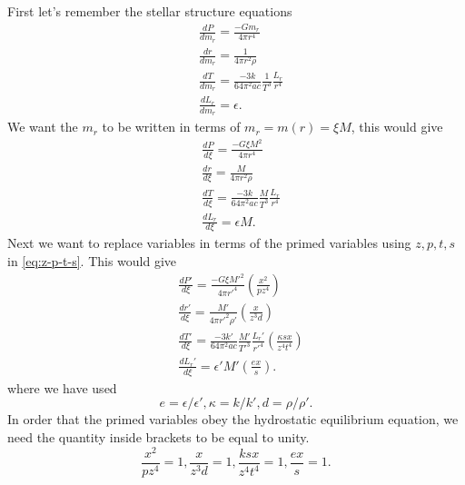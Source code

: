 \documentclass{revtex4-2}
\begin{document}
First let's remember the stellar structure equations
\begin{equation}
  \label{eq:hydrostatic}
  \begin{aligned}
    & \frac{dP}{dm_r} = \frac{-G m_r}{4\pi r^4} \\
    & \frac{dr}{dm_r} = \frac{1}{4\pi r^2 \rho}\\
    & \frac{dT}{dm_r} = \frac{-3k}{64\pi^2 ac} \frac{1}{T^3}\frac{L_r}{r^4}\\
    & \frac{dL_r}{dm_r} = \epsilon.
  \end{aligned}
\end{equation}
We want the $m_r$ to be written in terms of $m_r = m(r) = \xi M$, this would give
\begin{equation}
  \label{eq:hydrostatic-in-xi}
  \begin{aligned}
    & \frac{dP}{d\xi} = \frac{-G \xi M^2}{4\pi r^4} \\
    & \frac{dr}{d\xi} = \frac{M}{4\pi r^2 \rho}\\
    & \frac{dT}{d\xi} = \frac{-3k}{64\pi^2 ac} \frac{M}{T^3}\frac{L_r}{r^4}\\
    & \frac{dL_r}{d\xi} = \epsilon M.
  \end{aligned}
\end{equation}
Next we want to replace variables in terms of the primed variables using $z, p, t, s$ in \eqref{eq:z-p-t-s}. This would give
\begin{equation}
  \label{eq:hydrostatic-in-xi-primed}
  \begin{aligned}
    & \frac{dP'}{d\xi} = \frac{-G \xi M'^2}{4\pi r'^4}\left(\frac{x^2}{p z^4}\right)  \\
    & \frac{dr'}{d\xi} = \frac{M'}{4\pi r'^2 \rho'}\left(\frac{x}{z^3d}\right) \\
    & \frac{dT'}{d\xi} = \frac{-3k'}{64\pi^2 ac} \frac{M'}{T'^3}\frac{L_r'}{r'^4} \left(\frac{\kappa s x}{z^4 t^4}\right) \\
    & \frac{dL_r'}{d\xi} = \epsilon' M' \left(\frac{e x}{s}\right) .
  \end{aligned}
\end{equation}
where we have used
\begin{equation}
  e = \epsilon/\epsilon', \kappa = k/k', d = \rho/\rho'.
  \label{eq:e-kappa-d}
\end{equation}
In order that the primed variables obey the hydrostatic equilibrium equation, we need the quantity inside brackets to be equal to unity.
\begin{equation}
  \label{eq:homologous-condition}
  \frac{x^2}{pz^4} = 1, \frac{x}{z^3d} = 1, \frac{ksx}{z^4 t^4} = 1, \frac{ex}{s} = 1.
\end{equation}
\end{document}

